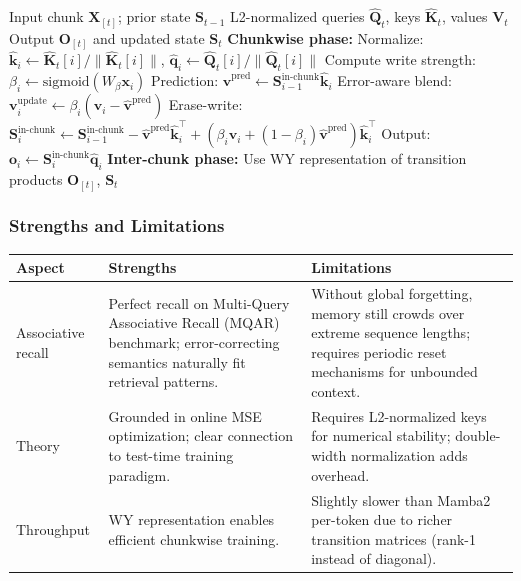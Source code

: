 \begin{algorithm}[H]
\caption{DeltaNet State Update with WY Representation}
\begin{algorithmic}[1]
\Require Input chunk $\mathbf{X}_{[t]}$; prior state $\mathbf{S}_{t-1}$
\Require L2-normalized queries $\hat{\mathbf{Q}}_t$, keys $\hat{\mathbf{K}}_t$, values $\mathbf{V}_t$
\Ensure Output $\mathbf{O}_{[t]}$ and updated state $\mathbf{S}_t$
\State \textbf{Chunkwise phase:}
    \State Normalize: $\hat{\mathbf{k}}_i \gets \hat{\mathbf{K}}_t[i] / \|\hat{\mathbf{K}}_t[i]\|$, $\hat{\mathbf{q}}_i \gets \hat{\mathbf{Q}}_t[i] / \|\hat{\mathbf{Q}}_t[i]\|$
    \State Compute write strength: $\beta_i \gets \text{sigmoid}(W_\beta \mathbf{x}_i)$
    \State Prediction: $\hat{\mathbf{v}}^\text{pred} \gets \mathbf{S}_{i-1}^\text{in-chunk} \hat{\mathbf{k}}_i$
    \State Error-aware blend: $\mathbf{v}_i^\text{update} \gets \beta_i(\mathbf{v}_i - \hat{\mathbf{v}}^\text{pred})$
    \State Erase-write: $\mathbf{S}_i^\text{in-chunk} \gets \mathbf{S}_{i-1}^\text{in-chunk} - \hat{\mathbf{v}}^\text{pred}\hat{\mathbf{k}}_i^\top + (\beta_i \mathbf{v}_i + (1-\beta_i)\hat{\mathbf{v}}^\text{pred})\hat{\mathbf{k}}_i^\top$
    \State Output: $\mathbf{o}_i \gets \mathbf{S}_i^\text{in-chunk} \hat{\mathbf{q}}_i$
\EndFor
\State \textbf{Inter-chunk phase:} Use WY representation of transition products
\Return $\mathbf{O}_{[t]}$, $\mathbf{S}_{t}$
\end{algorithmic}
\end{algorithm}

\subsubsection{Strengths and Limitations}

\begin{table}[H]
\centering
\small
\begin{tabularx}{0.95\linewidth}{Xp{4cm}p{4cm}}
\toprule
\textbf{Aspect} & \textbf{Strengths} & \textbf{Limitations} \\
\midrule
Associative recall & Perfect recall on Multi-Query Associative Recall (MQAR) benchmark; error-correcting semantics naturally fit retrieval patterns. & Without global forgetting, memory still crowds over extreme sequence lengths; requires periodic reset mechanisms for unbounded context. \\
Theory & Grounded in online MSE optimization; clear connection to test-time training paradigm. & Requires L2-normalized keys for numerical stability; double-width normalization adds overhead. \\
Throughput & WY representation enables efficient chunkwise training. & Slightly slower than Mamba2 per-token due to richer transition matrices (rank-1 instead of diagonal). \\
\bottomrule
\end{tabularx}
\end{table}

